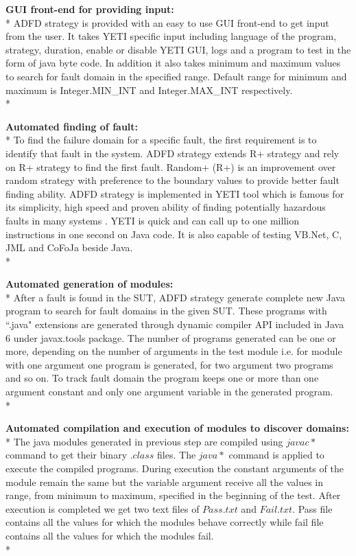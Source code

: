 \noindent \textbf{GUI front-end for providing input:}\\*
ADFD strategy is provided with an easy to use GUI front-end to get input from the user. It takes YETI specific input including language of the program, strategy, duration, enable or disable YETI GUI, logs and a program to test in the form of java byte code. In addition it also takes minimum and maximum values to search for fault domain in the specified range. Default range for minimum and maximum is Integer.MIN\_INT and Integer.MAX\_INT respectively.\\*

\noindent \textbf{Automated finding of fault:}\\*
To find the failure domain for a specific fault, the first requirement is to identify that fault in the system. ADFD strategy extends R+ strategy and rely on R+ strategy to find the first fault. Random+ (R+) is an improvement over random strategy with preference to the boundary values to provide better fault finding ability. ADFD strategy is implemented in YETI tool which is famous for its simplicity, high speed and proven ability of finding potentially hazardous faults in many systems \cite{Oriol2011, Oriol2012}. YETI is quick and can call up to one million instructions in one second on Java code. It is also capable of testing VB.Net, C, JML and CoFoJa beside Java. \\*

\noindent \textbf{Automated generation of modules:}\\*
After a fault is found in the SUT, ADFD strategy generate complete new Java program to search for fault domains in the given SUT.  These programs with ``.java" extensions are generated through dynamic compiler API included in Java 6 under javax.tools package. The number of programs generated can be one or more, depending on the number of arguments in the test module i.e. for module with one argument one program is generated, for two argument two programs and so on. To track fault domain the program keeps one or more than one argument constant and only one argument variable in the generated program.\\*

\noindent \textbf{Automated compilation and execution of modules to discover domains:}\\*
The java modules generated in previous step are compiled using $javac *$ command to get their binary $.class$ files. The $java *$ command is applied to execute the compiled programs. During execution the constant arguments of the module remain the same but the variable argument receive all the values in range, from minimum to maximum, specified in the beginning of the test. After execution is completed we get two text files of $Pass.txt$ and $Fail.txt$. Pass file contains all the values for which the modules behave correctly while fail file contains all the values for which the modules fail.\\*

